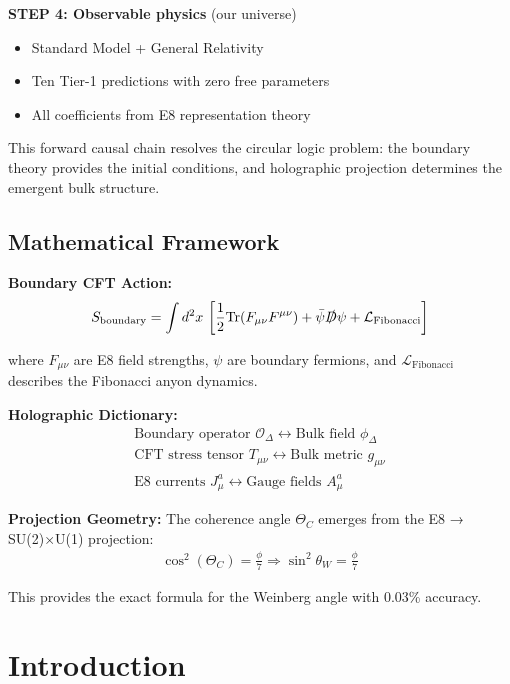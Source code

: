 \documentclass[11pt]{article}
\theoremstyle{definition}
\newcommand{\goldenratio}{\phi}
\begin{document}
\textbf{STEP 4: Observable physics} (our universe)
\begin{itemize}
\item Standard Model + General Relativity
\item Ten Tier-1 predictions with zero free parameters
\item All coefficients from E8 representation theory
\end{itemize}

This forward causal chain resolves the circular logic problem: the boundary theory provides the initial conditions, and holographic projection determines the emergent bulk structure.

\subsection{Mathematical Framework}

\textbf{Boundary CFT Action:}
\begin{align}
S_{\text{boundary}} = \int d^2x \, \left[ \frac{1}{2} \text{Tr}(F_{\mu\nu}F^{\mu\nu}) + \bar{\psi} \slashed{D} \psi + \mathcal{L}_{\text{Fibonacci}} \right]
\end{align}

where $F_{\mu\nu}$ are E8 field strengths, $\psi$ are boundary fermions, and $\mathcal{L}_{\text{Fibonacci}}$ describes the Fibonacci anyon dynamics.

\textbf{Holographic Dictionary:}
\begin{align}
\text{Boundary operator } \mathcal{O}_\Delta \leftrightarrow \text{Bulk field } \phi_\Delta \\
\text{CFT stress tensor } T_{\mu\nu} \leftrightarrow \text{Bulk metric } g_{\mu\nu} \\
\text{E8 currents } J^a_\mu \leftrightarrow \text{Gauge fields } A^a_\mu
\end{align}

\textbf{Projection Geometry:}
The coherence angle $\Theta_C$ emerges from the E8 → SU(2)×U(1) projection:
\begin{align}
\cos^2(\Theta_C) = \frac{\goldenratio}{7} \Rightarrow \sin^2\theta_W = \frac{\goldenratio}{7}
\end{align}

This provides the exact formula for the Weinberg angle with 0.03\% accuracy.

\section{Introduction}
\end{document}

